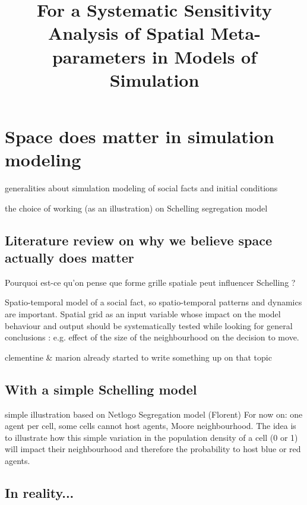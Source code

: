 \documentclass[a4paper,12pt]{article}
\begin{document}
\title{
For a Systematic Sensitivity Analysis of Spatial Meta-parameters in Models of Simulation
}


\date{}

\maketitle

\section{Space does matter in simulation modeling}

generalities about simulation modeling of social facts and initial conditions

the choice of working (as an illustration) on Schelling segregation model 

\subsection{Literature review on why we believe space actually does matter}

Pourquoi est-ce qu'on pense que forme grille spatiale peut influencer Schelling ?

Spatio-temporal model of a social fact, so spatio-temporal patterns and dynamics are important. Spatial grid as an input variable whose impact on the model behaviour and output should be systematically tested while looking for general conclusions : e.g. effect of the size of the neighbourhood on the decision to move.

clementine \& marion already started to write something up on that topic

\subsection{With a simple Schelling model}

simple illustration based on Netlogo Segregation model (Florent)
For now on: one agent per cell, some cells cannot host agents, Moore neighbourhood. The idea is to illustrate how this simple variation in the population density of a cell (0 or 1) will impact their neighbourhood and therefore the probability to host blue or red agents.

\subsection{In reality...}
\end{document}

